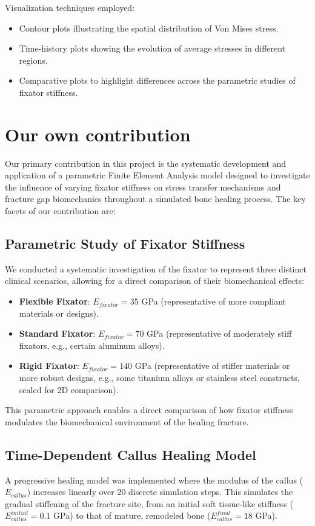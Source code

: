 \documentclass{article}
\begin{document}
Visualization techniques employed:
\begin{itemize}
  \item Contour plots illustrating the spatial distribution of Von Mises stress.
  \item Time-history plots showing the evolution of average stresses in different regions.
  \item Comparative plots to highlight differences across the parametric studies of fixator stiffness.
\end{itemize}


\section{Our own contribution}

Our primary contribution in this project is the systematic development and application of a parametric Finite Element Analysis model designed to investigate the influence of varying fixator stiffness on stress transfer mechanisms and fracture gap biomechanics throughout a simulated bone healing process. The key facets of our contribution are:

\subsection{Parametric Study of Fixator Stiffness}
We conducted a systematic investigation of the fixator to represent three distinct clinical scenarios, allowing for a direct comparison of their biomechanical effects:
\begin{itemize}
  \item \textbf{Flexible Fixator}: $E_{fixator} = 35$ GPa (representative of more compliant materials or designs).
  \item \textbf{Standard Fixator}: $E_{fixator} = 70$ GPa (representative of moderately stiff fixators, e.g., certain aluminum alloys).
  \item \textbf{Rigid Fixator}: $E_{fixator} = 140$ GPa (representative of stiffer materials or more robust designs, e.g., some titanium alloys or stainless steel constructs, scaled for 2D comparison).
\end{itemize}
This parametric approach enables a direct comparison of how fixator stiffness modulates the biomechanical environment of the healing fracture.

\subsection{Time-Dependent Callus Healing Model}
A progressive healing model was implemented where the modulus of the callus ($E_{callus}$) increases linearly over 20 discrete simulation steps. This simulates the gradual stiffening of the fracture site, from an initial soft tissue-like stiffness ($E_{callus}^{initial} = 0.1$ GPa) to that of mature, remodeled bone ($E_{callus}^{final} = 18$ GPa).
\end{document}
